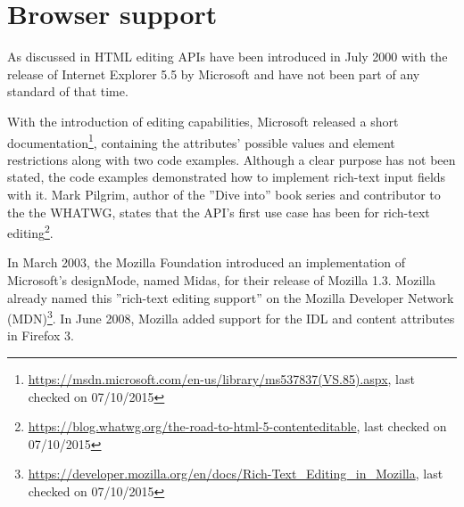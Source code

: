 

\section{Browser support}

As discussed in  HTML editing APIs have been introduced in July 2000 with the release of Internet Explorer 5.5 by Microsoft and have not been part of any standard of that time.


With the introduction of editing capabilities, Microsoft released a short documentation\footnote{\url{https://msdn.microsoft.com/en-us/library/ms537837(VS.85).aspx}, last checked on 07/10/2015}, containing the attributes' possible values and element restrictions along with two code examples. Although a clear purpose has not been stated, the code examples demonstrated how to implement rich-text input fields with it. Mark Pilgrim, author of the ''Dive into'' book series and contributor to the the WHATWG, states that the API's first use case has been for rich-text editing\footnote{\url{https://blog.whatwg.org/the-road-to-html-5-contenteditable}, last checked on 07/10/2015}. 




In March 2003, the Mozilla Foundation introduced an implementation of Microsoft's designMode, named Midas, for their release of Mozilla 1.3. Mozilla already named this ''rich-text editing support'' on the Mozilla Developer Network (MDN)\footnote{\url{https://developer.mozilla.org/en/docs/Rich-Text\_Editing\_in\_Mozilla}, last checked on 07/10/2015}. In June 2008, Mozilla added support for the  IDL and  content attributes in Firefox 3. 

